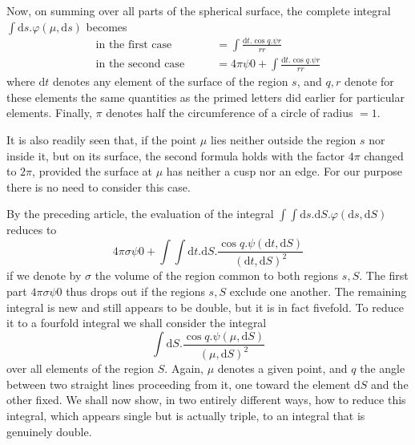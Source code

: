 Now, on summing over all parts of the spherical surface, the complete integral $\int\mathrm{d}s.\varphi(\mu,\mathrm{d}s)$ becomes
\[
\begin{aligned}
\text{in the first case}\qquad&=\int\frac{\mathrm{d}t.\cos q.\psi r}{rr}\\
\text{in the second case}\qquad&=4\pi\psi0+\int\frac{\mathrm{d}t.\cos q.\psi r}{rr}
\end{aligned}
\]
where $\mathrm{d}t$ denotes any element of the surface of the region $s$, and $q,r$ denote for these elements the same quantities as the primed letters did earlier for particular elements. Finally, $\pi$ denotes half the circumference of a circle of radius $=1$.

It is also readily seen that, if the point $\mu$ lies neither outside the region $s$ nor inside it, but on its surface, the second formula holds with the factor $4\pi$ changed to $2\pi$, provided the surface at $\mu$ has neither a cusp nor an edge. For our purpose there is no need to consider this case.

By the preceding article, the evaluation of the integral $\int\int\mathrm{d}s.\mathrm{d}S.\varphi(\mathrm{d}s,\mathrm{d}S)$ reduces to
\[
4\pi\sigma\psi0+\int\int\mathrm{d}t.\mathrm{d}S.\frac{\cos q.\psi(\mathrm{d}t,\mathrm{d}S)}{(\mathrm{d}t,\mathrm{d}S)^2}
\]
if we denote by $\sigma$ the volume of the region common to both regions $s,S$. The first part $4\pi\sigma\psi0$ thus drops out if the regions $s,S$ exclude one another. The remaining integral is new and still appears to be double, but it is in fact fivefold. To reduce it to a fourfold integral we shall consider the integral
\[
\int\mathrm{d}S.\frac{\cos q.\psi(\mu,\mathrm{d}S)}{(\mu,\mathrm{d}S)^2}
\]
over all elements of the region $S$. Again, $\mu$ denotes a given point, and $q$ the angle between two straight lines proceeding from it, one toward the element $\mathrm{d}S$ and the other fixed. We shall now show, in two entirely different ways, how to reduce this integral, which appears single but is actually triple, to an integral that is genuinely double.

